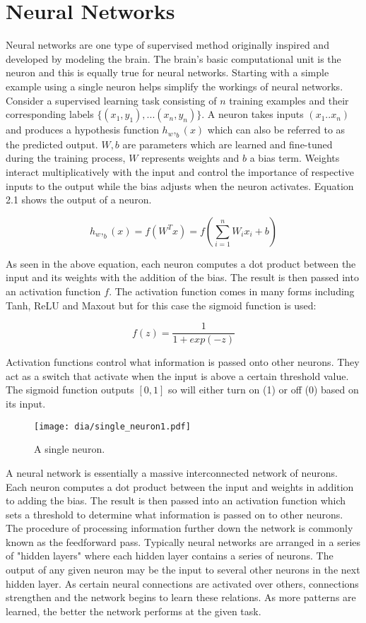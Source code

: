 \documentclass[12pt]{report}
\begin{document}
\section{Neural Networks}
Neural networks are one type of supervised method originally inspired and developed by modeling the brain. The brain's basic computational unit is the neuron and this is equally true for neural networks. Starting with a simple example using a single neuron helps simplify the workings of neural networks. Consider a supervised learning task consisting of $n$ training examples and their corresponding labels $\{(x_1,y_1),...(x_n,y_n)\}$. A neuron takes inputs ${(x_1..x_n)}$ and produces a hypothesis function ${h_w,_b(x)}$ which can also be referred to as the predicted output. ${W, b}$ are parameters which are learned and fine-tuned during the training process, ${W}$ represents weights and ${b}$ a bias term. Weights interact multiplicatively with the input and control the importance of respective inputs to the output while the bias adjusts when the neuron activates.  Equation 2.1 shows the output of a neuron.

\begin{equation}
h_w,_b(x) = f(W^Tx) = f(\sum_{i=1}^{n}W_ix_i + b)
\end{equation}

As seen in the above equation, each neuron computes a dot product between the input and its weights with the addition of the bias.  The result is then passed into an activation function $f$.  The activation function comes in many forms including Tanh, ReLU and Maxout but for this case the sigmoid function is used:

\begin{equation}
f(z) = \frac{1}{1 + exp(-z)}
\end{equation}

Activation functions control what information is passed onto other neurons.  They act as a switch that activate when the input is above a certain threshold value.  The sigmoid function outputs $[0,1]$ so will either turn on (1) or off (0) based on its input. 

\begin{figure}[H]
\centering
\texttt{[image: dia/single\_neuron1.pdf]}
\caption{A single neuron.}
\end{figure}

A neural network is essentially a massive interconnected network of neurons.  Each neuron computes a dot product between the input and weights in addition to adding the bias. The result is then passed into an activation function which sets a threshold to determine what information is passed on to other neurons. The procedure of processing information further down the network is commonly known as the feedforward pass. Typically neural networks are arranged in a series of "hidden layers" where each hidden layer contains a series of neurons. The output of any given neuron may be the input to several other neurons in the next hidden layer.  As certain neural connections are activated  over others, connections strengthen and the network begins to learn these relations.  As more patterns are learned, the better the network performs at the given task.
\end{document}
